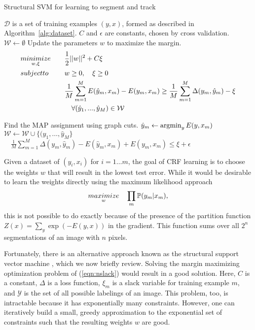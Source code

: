 \documentclass[journal]{IEEEtran}
\begin{document}
\begin{algorithm*}
  \caption{Structural SVM for learning to segment and track}
  \label{alg:ssvm}
  \begin{algorithmic}
    \STATE $\mathcal{D}$ is a set of training examples $(y, x)$,                             formed as described in Algorithm~\ref{alg:dataset}.
\STATE $C$ and $\epsilon$ are constants, chosen by cross validation.
\STATE 
\STATE $\mathcal{W} \leftarrow \emptyset$
\REPEAT
\STATE Update the parameters $w$ to maximize the margin.
\begin{equation*}
  \begin{aligned}
    & \underset{w, \xi}{\relax{minimize}}\quad & & \frac{1}{2} ||w||^2 + C\xi \\
    & \relax{subject to }\quad & & w \geq 0, \quad \xi \geq 0 \\
    & & & \frac{1}{M} \sum_{m=1}^M E ( \hat{y}_m, x_m )
    - E ( y_m, x_m ) \geq \frac{1}{M} \sum_{m=1}^M \Delta(y_m, \hat{y}_m) - \xi \\
    & & & \quad \forall (\hat{y}_1, ..., \hat{y}_M) \in \mathcal{W}
  \end{aligned}
\end{equation*}

\STATE Find the MAP assignment using graph cuts.
\STATE $\hat{y}_m \leftarrow \operatorname{argmin}_y E (y, x_m )$
\ENDFOR
\STATE $\mathcal{W} \leftarrow \mathcal{W} \cup \{(\hat{y}_1, \dots, \hat{y}_M\}$
\UNTIL $\quad \frac{1}{M} \sum_{m = 1}^M \Delta(y_m, \hat{y}_m) - E ( \hat{y}_m, x_m) + E ( y_m, x_m ) \leq \xi + \epsilon$
  \end{algorithmic}
\end{algorithm*}

Given a dataset of $(y_i, x_i)$ for $i=1 \dots m$, the goal of CRF learning is to choose the weights $w$ that will result in the lowest test error. While it would be desirable to learn the weights directly using the maximum likelihood approach
\begin{align}
  \underset{w}{\relax{maximize}}\quad \prod_m \mathbb{P}(y_m | x_m),
\end{align}
this is not possible to do exactly because of the presence of the partition function $Z(x) = \sum_{y} \exp(-E(y, x))$ in the gradient.  This function sums over all $2^n$ segmentations of an image with $n$ pixels.

Fortunately, there is an alternative approach known as the structural support vector machine \cite{taskar2005a, tsochantaridis2005a, szummer2008a}, which we now briefly review.  Solving the margin maximizing optimization problem of (\ref{eqn:nslack}) would result in a good solution. Here, $C$ is a constant, $\Delta$ is a loss function, $\xi_m$ is a slack variable for training example $m$, and $\mathcal{Y}$ is the set of all possible labelings of an image. This problem, too, is intractable because it has exponentially many constraints.  However, one can iteratively build a small, greedy approximation to the exponential set of constraints such that the resulting weights $w$ are good.
\end{document}
